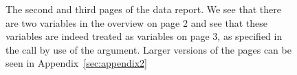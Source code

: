 \documentclass[article,shortnames]{jss}
\begin{document}
\begin{figure}[tb]
\begin{center}
\end{center}
\caption{The second and third pages of the  data report. We see that there are two  variables in the overview on page 2 and see that these variables are indeed treated as  variables on page 3, as specified in the  call by use of the  argument. Larger versions of the pages can be seen in
  Appendix~\ref{sec:appendix2}}
\label{fig:bigExampleP23}
\end{figure}
\end{document}
